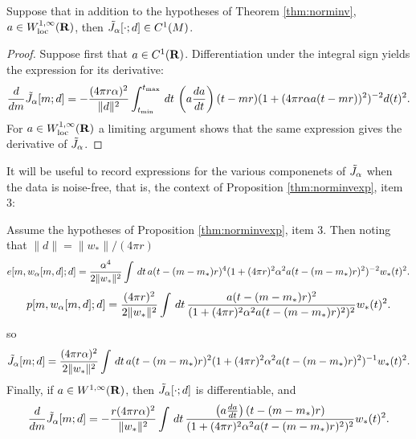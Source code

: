 \begin{theorem}
  \label{thm:diffobj}
  Suppose that in addition to the hypotheses of Theorem
  \ref{thm:norminv}, $a \in W^{1,\infty}_{\rm loc}({\bf R})$, then $\tilde{J}_{\alpha}[\cdot;d]
  \in C^1(M)$.
\end{theorem}

\begin{proof}
Suppose first that $a \in C^1({\bf R})$. Differentiation under the integral sign  
  yields the expression for its derivative:
\begin{equation}
  \label{eqn:dexpjgen}
  \frac{d}{dm}\tilde{J}_{\alpha}[m;d] = -\frac{(4 \pi r \alpha)^2}{\|d\|^2} \int_{t_{\rm min}}^{t_{\rm max}} \,dt \, 
  \left(a\frac{da}{dt}\right)(t-mr)(1+(4\pi r \alpha 
  a(t-mr))^2)^{-2}d(t)^2. 
\end{equation}
For $a \in W^{1,\infty}_{\rm loc}({\bf R})$ a limiting argument shows that the
same expression gives the derivative of $\tilde{J}_{\alpha}$.
\end{proof}

It will be useful to record expressions for the various componenets of
$\tilde{J}_{\alpha}$ when the data is noise-free, that is, the context of
Proposition \ref{thm:norminvexp}, item 3:
\begin{corollary}
  \label{thm:epjnonoise}
  Assume the hypotheses of Proposition \ref{thm:norminvexp}, item
  3. Then noting that $\|d\| = \|w_*\|/(4 \pi r)$
\begin{equation}
  \label{eqn:residnorm}
  e[m,w_{\alpha}[m,d];d] 
= \frac{\alpha^4}{2\|w_*\|^2}\int\,dt\,a(t-(m-m_*)r)^4(1+(4\pi r)^2 \alpha^2 
    a(t-(m-m_*)r)^2)^{-2}w_*(t)^2.
\end{equation}
\begin{equation}
  \label{eqn:anninorm}
  p[m,w_{\alpha}[m,d];d] = \frac{(4\pi r)^2}{2\|w_*\|^2}\int \,dt\,  
  \frac{a(t-(m-m_*)r)^2}{(1+ (4\pi r)^2\alpha^2
    a(t-(m-m_*)r)^2)^{2}}w_*(t)^2.
\end{equation}
so 
\begin{equation}
\label{eqn:expjnonoise}
\tilde{J}_{\alpha}[m;d] = \frac{(4\pi r \alpha)^2}{2\|w_*\|^2}\int\,dt\,a(t-(m-m_*)r)^2(1+(4\pi r)^2 \alpha^2 
  a(t-(m-m_*)r)^2)^{-1}w_*(t)^2. 
\end{equation}
Finally, if $a \in W^{1,\infty}({\bf R})$, then $\tilde{J}_{\alpha}[\cdot;d]$ is differentiable, and 
\begin{equation}
  \label{eqn:dexpjnonoise}
  \frac{d}{dm}\tilde{J}_{\alpha}[m;d] = -\frac{r (4\pi r \alpha)^2}{\|w_*\|^2} \int \,dt \, 
  \frac{\left(a\frac{da}{dt}\right)(t-(m-m_*)r)}{(1+(4\pi r)^2 \alpha^2 
  a(t-(m-m_*)r)^2)^{2}}w_*(t)^2. 
\end{equation}
\end{corollary}

